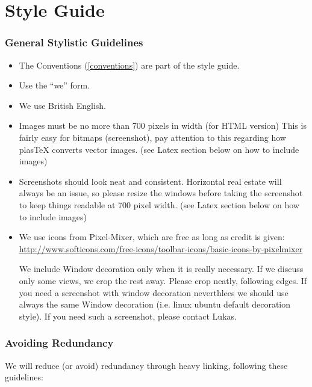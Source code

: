 \section{Style Guide}


\subsubsection{General Stylistic Guidelines}

\begin{itemize}
	\item The Conventions (\ref{conventions}) are part of the style guide.
	\item Use the ``we'' form.
	\item We use British English.
	\item Images must be no more than 700 pixels in width (for HTML version)  This is fairly easy for bitmaps (screenshot), pay attention to this regarding how plasTeX converts vector images. (see Latex section below on how to include images)
    \item Screenshots should look neat and consistent.  Horizontal real estate will always be an issue, so please resize the windows before taking the screenshot to keep things readable at 700 pixel width.  (see Latex section below on how to include images)
	\item We use icons from Pixel-Mixer, which are free as long as credit is given: \url{http://www.softicons.com/free-icons/toolbar-icons/basic-icons-by-pixelmixer}

  We include Window decoration only when it is really necessary.  If we discuss only some views, we crop the rest away.  Please crop neatly, following edges. If you need a screenshot with window decoration neverthlees we should use always the same Window decoration (i.e. linux ubuntu default decoration style). If you need such a screenshot, please contact Lukas.

\end{itemize}

\subsubsection{Avoiding Redundancy}

We will reduce (or avoid) redundancy through heavy linking, following these guidelines:


